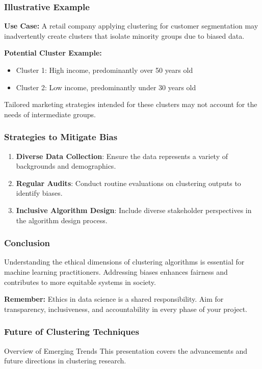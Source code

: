 \documentclass[aspectratio=169]{beamer}
\begin{document}
\begin{frame}[fragile]
    \frametitle{Illustrative Example}
    \textbf{Use Case:} A retail company applying clustering for customer segmentation may inadvertently create clusters that isolate minority groups due to biased data.

    \textbf{Potential Cluster Example:}
    \begin{itemize}
        \item Cluster 1: High income, predominantly over 50 years old
        \item Cluster 2: Low income, predominantly under 30 years old
    \end{itemize}
    
    Tailored marketing strategies intended for these clusters may not account for the needs of intermediate groups.
\end{frame}

\begin{frame}[fragile]
    \frametitle{Strategies to Mitigate Bias}
    \begin{enumerate}
        \item \textbf{Diverse Data Collection}: Ensure the data represents a variety of backgrounds and demographics.
        \item \textbf{Regular Audits}: Conduct routine evaluations on clustering outputs to identify biases.
        \item \textbf{Inclusive Algorithm Design}: Include diverse stakeholder perspectives in the algorithm design process.
    \end{enumerate}
\end{frame}

\begin{frame}[fragile]
    \frametitle{Conclusion}
    Understanding the ethical dimensions of clustering algorithms is essential for machine learning practitioners. Addressing biases enhances fairness and contributes to more equitable systems in society.

    \textbf{Remember:} Ethics in data science is a shared responsibility. Aim for transparency, inclusiveness, and accountability in every phase of your project.
\end{frame}

\begin{frame}[fragile]
    \frametitle{Future of Clustering Techniques}
    \begin{block}{Overview of Emerging Trends}
        This presentation covers the advancements and future directions in clustering research.
    \end{block}
\end{frame}
\end{document}

